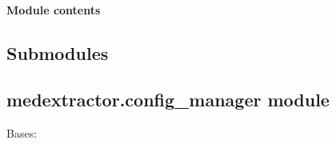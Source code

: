 \documentclass[letterpaper,10pt,english]{sphinxmanual}
\begin{document}
\begin{fulllineitems}
\begin{fulllineitems}
\label{\detokenize{medextractor.rdf:medextractor.rdf.graphmanager.GraphManager.get_serialized_graph}}
\pysigstartsignatures
{}
\pysigstopsignatures
\end{fulllineitems}


\end{fulllineitems}



\paragraph{Module contents}
\label{\detokenize{medextractor.rdf:module-medextractor.rdf}}\label{\detokenize{medextractor.rdf:module-contents}}

\subsection{Submodules}
\label{\detokenize{medextractor:submodules}}

\subsection{medextractor.config\_manager module}
\label{\detokenize{medextractor:module-medextractor.config_manager}}\label{\detokenize{medextractor:medextractor-config-manager-module}}

\begin{fulllineitems}
\label{\detokenize{medextractor:medextractor.config_manager.ConfigManager}}
\pysigstartsignatures
{}
\pysigstopsignatures
\sphinxAtStartPar
Bases: 

\end{fulllineitems}
\end{document}
